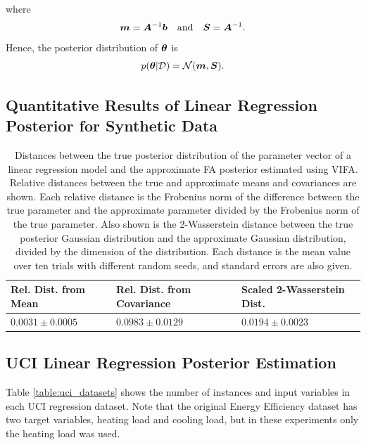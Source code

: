 \documentclass[10pt]{article} %
\begin{document}
where
\begin{equation}
	{\bm{m}} = {\bm{A}}^{-1} {\bm{b}}
	\quad \text{and} \quad 
	{\bm{S}} = {\bm{A}}^{-1}.
\end{equation}
Hence, the posterior distribution of ${\bm{\theta}}$ is 
\begin{align}
\begin{split}
	p({\bm{\theta}} | \mathcal{D}) = \mathcal{N}({\bm{m}}, {\bm{S}}).
\end{split}
\end{align}


\subsection{Quantitative Results of Linear Regression Posterior for Synthetic Data}
\label{app:quantitative_results_linear_regression_posterior}

\begin{table}[h!]
\caption{Distances between the true posterior distribution of the parameter vector of a linear regression model and the approximate FA posterior estimated using VIFA. Relative distances between the true and approximate means and covariances are shown. Each relative distance is the Frobenius norm of the difference between the true parameter and the approximate parameter divided by the Frobenius norm of the true parameter. Also shown is the 2-Wasserstein distance between the true posterior Gaussian distribution and the approximate Gaussian distribution, divided by the dimension of the distribution. Each distance is the mean value over ten trials with different random seeds, and standard errors are also given.}
\begin{center}
\begin{tabular}{lll}
\label{table:linear_regression_vi_posterior}
\textbf{Rel. Dist. from Mean} & \textbf{Rel. Dist. from Covariance} & \textbf{Scaled 2-Wasserstein Dist.} \\ \hline
$0.0031 \pm 0.0005$ 	& $0.0983 \pm 0.0129$ 	& $0.0194 \pm 0.0023$ \\ 
\end{tabular}
\end{center}
\end{table}

\subsection{UCI Linear Regression Posterior Estimation}
\label{app:uci_posterior}
Table \ref{table:uci_datasets} shows the number of instances and input variables in each UCI regression dataset. Note that the original Energy Efficiency dataset has two target variables, heating load and cooling load, but in these experiments only the heating load was used.
\end{document}
